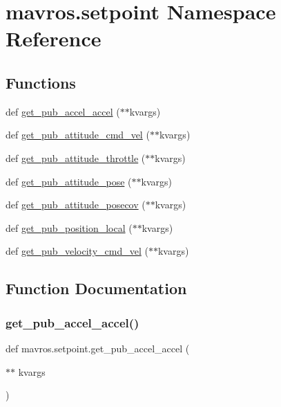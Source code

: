 \hypertarget{namespacemavros_1_1setpoint}{}\section{mavros.\+setpoint Namespace Reference}
\label{namespacemavros_1_1setpoint}
\subsection*{Functions}
\begin{DoxyCompactItemize}
\item 
def \mbox{\hyperlink{namespacemavros_1_1setpoint_a8124a34e706d35125b5c5ba92461e946}{get\+\_\+pub\+\_\+accel\+\_\+accel}} ($\ast$$\ast$kvargs)
\item 
def \mbox{\hyperlink{namespacemavros_1_1setpoint_ae856b3bec00ce8f060de2b5feb586d75}{get\+\_\+pub\+\_\+attitude\+\_\+cmd\+\_\+vel}} ($\ast$$\ast$kvargs)
\item 
def \mbox{\hyperlink{namespacemavros_1_1setpoint_ae3708c3ad1c4a57dfe0f93fe38a16c56}{get\+\_\+pub\+\_\+attitude\+\_\+throttle}} ($\ast$$\ast$kvargs)
\item 
def \mbox{\hyperlink{namespacemavros_1_1setpoint_a1270f4dbcb7a3da0205ef7e54724e3f7}{get\+\_\+pub\+\_\+attitude\+\_\+pose}} ($\ast$$\ast$kvargs)
\item 
def \mbox{\hyperlink{namespacemavros_1_1setpoint_a276d8b4fb7f05ece98f12736cdff8a97}{get\+\_\+pub\+\_\+attitude\+\_\+posecov}} ($\ast$$\ast$kvargs)
\item 
def \mbox{\hyperlink{namespacemavros_1_1setpoint_a192309cd81a2562d7d418f509f2be04f}{get\+\_\+pub\+\_\+position\+\_\+local}} ($\ast$$\ast$kvargs)
\item 
def \mbox{\hyperlink{namespacemavros_1_1setpoint_aaa93a3bb0bc2030ec26a047440eed7b3}{get\+\_\+pub\+\_\+velocity\+\_\+cmd\+\_\+vel}} ($\ast$$\ast$kvargs)
\end{DoxyCompactItemize}


\subsection{Function Documentation}
\mbox{\label{namespacemavros_1_1setpoint_a8124a34e706d35125b5c5ba92461e946}} 
\subsubsection{\texorpdfstring{get\_pub\_accel\_accel()}{get\_pub\_accel\_accel()}}
{\footnotesize\ttfamily def mavros.\+setpoint.\+get\+\_\+pub\+\_\+accel\+\_\+accel (\begin{DoxyParamCaption}\item[{$\ast$$\ast$}]{kvargs }\end{DoxyParamCaption})}

